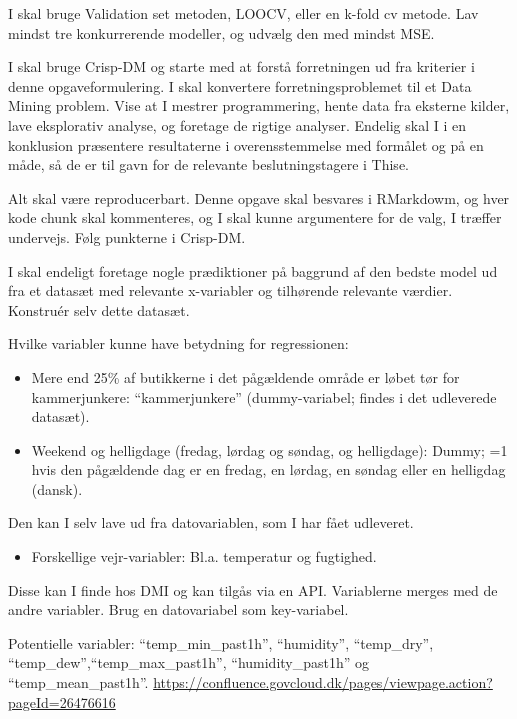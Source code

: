 \documentclass[
  12pt,
  a4paper,
  DIV=11,
  numbers=noendperiod]{scrartcl}
\providecommand{\tightlist}{%
  \setlength{\itemsep}{0pt}\setlength{\parskip}{0pt}}\usepackage{longtable,booktabs,array}
\begin{document}
\begin{itemize}
  I skal bruge Validation set metoden, LOOCV, eller en k-fold cv metode.
  Lav mindst tre konkurrerende modeller, og udvælg den med mindst MSE.~

  I skal bruge Crisp-DM og starte med at forstå forretningen ud fra
  kriterier i denne opgaveformulering. I skal konvertere
  forretningsproblemet til et Data Mining problem. Vise at I mestrer
  programmering, hente data fra eksterne kilder, lave eksplorativ
  analyse, og foretage de rigtige analyser. Endelig skal I i en
  konklusion præsentere resultaterne i overensstemmelse med formålet og
  på en måde, så de er til gavn for de relevante beslutningstagere i
  Thise.~

  Alt skal være reproducerbart. Denne opgave skal besvares i RMarkdowm,
  og hver kode chunk skal kommenteres, og I skal kunne argumentere for
  de valg, I træffer undervejs. Følg punkterne i Crisp-DM.~

  I skal endeligt foretage nogle prædiktioner på baggrund af den bedste
  model ud fra et datasæt med relevante x-variabler og tilhørende
  relevante værdier. Konstruér selv dette datasæt.~~

  Hvilke variabler kunne have betydning for regressionen:~

  \begin{itemize}
  \item
    Mere end 25\% af butikkerne i det pågældende område er løbet tør for
    kammerjunkere: ``kammerjunkere'' (dummy-variabel; findes i det
    udleverede datasæt).~
  \item
    Weekend og helligdage (fredag, lørdag og søndag, og helligdage):
    Dummy; =1 hvis den pågældende dag er en fredag, en lørdag, en søndag
    eller en helligdag (dansk).~
  \end{itemize}

  Den kan I selv lave ud fra datovariablen, som I har fået udleveret.~

  \begin{itemize}
  \tightlist
  \item
    Forskellige vejr-variabler: Bl.a. temperatur og fugtighed.~~
  \end{itemize}

  Disse kan I finde hos DMI og kan tilgås via en API. Variablerne merges
  med de andre variabler. Brug en datovariabel som key-variabel.~

  Potentielle variabler: ``temp\_min\_past1h'', ``humidity'',
  ``temp\_dry'', ``temp\_dew'',``temp\_max\_past1h'',
  ``humidity\_past1h'' og ``temp\_mean\_past1h''.
  \url{https://confluence.govcloud.dk/pages/viewpage.action?pageId=26476616}~~


\end{itemize}
\end{document}
